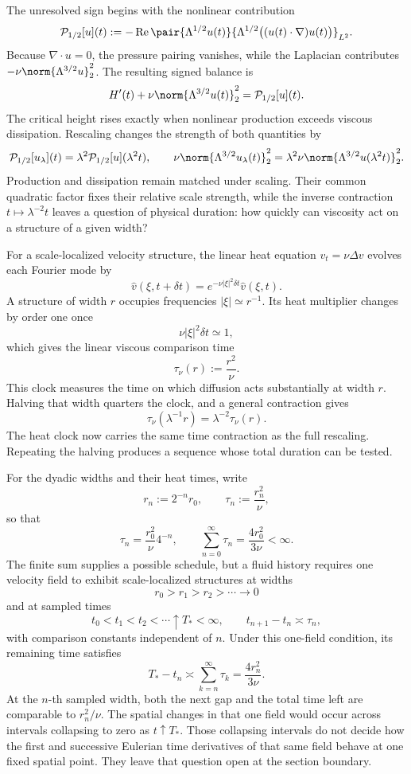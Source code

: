 
The unresolved sign begins with the nonlinear contribution
\[
  \mathcal P_{1/2}[u](t)
  :=
  -\operatorname{Re}
  \pair
    {\Lambda^{1/2}u(t)}
    {\Lambda^{1/2}\bigl((u(t)\cdot\nabla)u(t)\bigr)}_{L^2}.
\]
Because \(\nabla\cdot u=0\), the pressure pairing vanishes, while the Laplacian contributes \(-\nu\norm{\Lambda^{3/2}u}_2^2\). The resulting signed balance is
\[
  H'(t)
  +
  \nu\norm{\Lambda^{3/2}u(t)}_2^2
  =
  \mathcal P_{1/2}[u](t).
\]
The critical height rises exactly when nonlinear production exceeds viscous dissipation. Rescaling changes the strength of both quantities by
\[
  \mathcal P_{1/2}[u_\lambda](t)
  =
  \lambda^2\mathcal P_{1/2}[u](\lambda^2t),
  \qquad
  \nu\norm{\Lambda^{3/2}u_\lambda(t)}_2^2
  =
  \lambda^2\nu\norm{\Lambda^{3/2}u(\lambda^2t)}_2^2.
\]
Production and dissipation remain matched under scaling. Their common quadratic factor fixes their relative scale strength, while the inverse contraction \(t\mapsto\lambda^{-2}t\) leaves a question of physical duration: how quickly can viscosity act on a structure of a given width?


For a scale-localized velocity structure, the linear heat equation \(v_t=\nu\Delta v\) evolves each Fourier mode by
\[
  \widehat v(\xi,t+\delta t)
  =
  e^{-\nu|\xi|^2\delta t}\widehat v(\xi,t).
\]
A structure of width \(r\) occupies frequencies \(|\xi|\simeq r^{-1}\). Its heat multiplier changes by order one once
\[
  \nu|\xi|^2\delta t\simeq1,
\]
which gives the linear viscous comparison time
\[
  \tau_\nu(r)
  :=
  \frac{r^2}{\nu}.
\]
This clock measures the time on which diffusion acts substantially at width \(r\). Halving that width quarters the clock, and a general contraction gives
\[
  \tau_\nu(\lambda^{-1}r)
  =
  \lambda^{-2}\tau_\nu(r).
\]
The heat clock now carries the same time contraction as the full \NavierStokes{} rescaling. Repeating the halving produces a sequence whose total duration can be tested.


For the dyadic widths and their heat times, write
\[
  r_n:=2^{-n}r_0,
  \qquad
  \tau_n:=\frac{r_n^2}{\nu},
\]
so that
\[
  \tau_n
  =
  \frac{r_0^2}{\nu}4^{-n},
  \qquad
  \sum_{n=0}^{\infty}\tau_n
  =
  \frac{4r_0^2}{3\nu}
  <
  \infty.
\]
The finite sum supplies a possible schedule, but a fluid history requires one \NavierStokes{} velocity field to exhibit scale-localized structures at widths
\[
  r_0>r_1>r_2>\cdots\longrightarrow0
\]
and at sampled times
\[
  t_0<t_1<t_2<\cdots\uparrow T_*<\infty,
  \qquad
  t_{n+1}-t_n\asymp\tau_n,
\]
with comparison constants independent of \(n\). Under this one-field condition, its remaining time satisfies
\[
  T_*-t_n
  \asymp
  \sum_{k=n}^{\infty}\tau_k
  =
  \frac{4r_n^2}{3\nu}.
\]
At the \(n\)-th sampled width, both the next gap and the total time left are comparable to \(r_n^2/\nu\). The spatial changes in that one field would occur across intervals collapsing to zero as \(t\uparrow T_*\). Those collapsing intervals do not decide how the first and successive Eulerian time derivatives of that same field behave at one fixed spatial point. They leave that question open at the section boundary.
